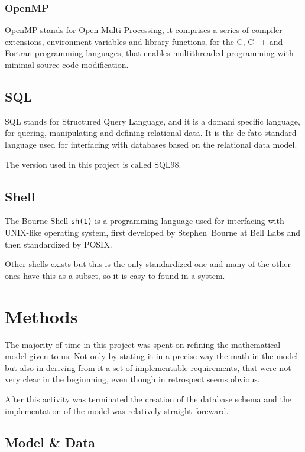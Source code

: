 \documentclass[Lau]{sapthesis} %
\begin{document}
\subsubsection{OpenMP}

OpenMP stands for Open Multi-Processing, it comprises a series of compiler
extensions, environment variables and library functions, for the C, C++ and
Fortran programming languages, that enables multithreaded programming with
minimal source code modification.

\subsection{SQL}

SQL stands for Structured Query Language, and it is a domani specific language,
for quering, manipulating and defining relational data. It is the de fato
standard language used for interfacing with databases based on the relational
data model.

The version used in this project is called SQL\raisebox{0.04cm}{:}98.

\subsection{Shell}

The Bourne Shell \texttt{sh(1)} is a programming language used for interfacing
with UNIX-like operating system, first developed by Stephen~Bourne at Bell Labs
and then standardized by POSIX.

Other shells exists but this is the only standardized one and many of the other
ones have this as a subset, so it is easy to found in a system.

\section{Methods}%

The majority of time in this project was spent on refining the mathematical
model given to us. Not only by stating it in a precise way the math in the model
but also in deriving from it a set of implementable requirements, that were not
very clear in the beginnning, even though in retrospect seems obvious.

After this activity was terminated the creation of the database schema and the
implementation of the model was relatively straight foreward.

\subsection{Model \& Data}
\end{document}
